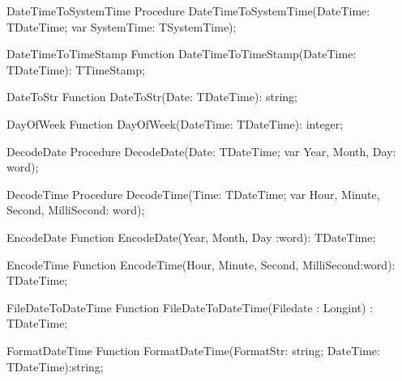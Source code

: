  
\begin{procedure}{DateTimeToSystemTime}
\Declaration
Procedure DateTimeToSystemTime(DateTime: TDateTime; var SystemTime: TSystemTime);
\Description
\Errors
\SeeAlso
\end{procedure}

 
\begin{function}{DateTimeToTimeStamp}
\Declaration
Function DateTimeToTimeStamp(DateTime: TDateTime): TTimeStamp;
\Description
\Errors
\SeeAlso
\end{function}

 
\begin{function}{DateToStr}
\Declaration
Function DateToStr(Date: TDateTime): string;
\Description
\Errors
\SeeAlso
\end{function}

 
\begin{function}{DayOfWeek}
\Declaration
Function DayOfWeek(DateTime: TDateTime): integer;
\Description
\Errors
\SeeAlso
\end{function}

 
\begin{procedure}{DecodeDate}
\Declaration
Procedure DecodeDate(Date: TDateTime; var Year, Month, Day: word);
\Description
\Errors
\SeeAlso
\end{procedure}

 
\begin{procedure}{DecodeTime}
\Declaration
Procedure DecodeTime(Time: TDateTime; var Hour, Minute, Second, MilliSecond: word);
\Description
\Errors
\SeeAlso
\end{procedure}

 
\begin{function}{EncodeDate}
\Declaration
Function EncodeDate(Year, Month, Day :word): TDateTime;
\Description
\Errors
\SeeAlso
\end{function}

 
\begin{function}{EncodeTime}
\Declaration
Function EncodeTime(Hour, Minute, Second, MilliSecond:word): TDateTime;
\Description
\Errors
\SeeAlso
\end{function}

 
\begin{function}{FileDateToDateTime}
\Declaration
Function FileDateToDateTime(Filedate : Longint) : TDateTime;
\Description
\Errors
\SeeAlso
\end{function}

 
\begin{function}{FormatDateTime}
\Declaration
Function FormatDateTime(FormatStr: string; DateTime: TDateTime):string;
\Description
\Errors
\SeeAlso
\end{function}

